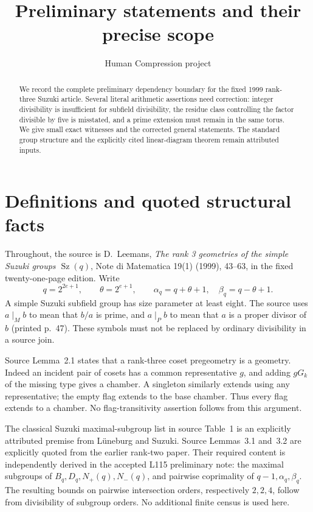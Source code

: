 \documentclass[11pt,a4paper]{article}
\title{Preliminary statements and their precise scope}
\author{Human Compression project}\date{}
\newcommand{\Sz}{\operatorname{Sz}}
\begin{document}
\maketitle
\begin{abstract}
We record the complete preliminary dependency boundary for the fixed 1999
rank-three Suzuki article. Several literal arithmetic assertions need
correction: integer divisibility is insufficient for subfield divisibility,
the residue class controlling the factor divisible by five is misstated,
and a prime extension must remain in the same torus. We give small exact
witnesses and the corrected general statements. The standard group structure
and the explicitly cited linear-diagram theorem remain attributed inputs.
\end{abstract}

\section{Definitions and quoted structural facts}
Throughout, the source is D.~Leemans, \emph{The rank 3 geometries of the
simple Suzuki groups $\Sz(q)$}, Note di Matematica 19(1) (1999), 43--63,
in the fixed twenty-one-page edition. Write
\[
 q=2^{2e+1},\qquad \theta=2^{e+1},\qquad
 \alpha_q=q+\theta+1,\quad \beta_q=q-\theta+1.
\]
A simple Suzuki subfield group has size parameter at least eight.
The source uses $a\mid_M b$ to mean that $b/a$ is prime, and
$a\mid_P b$ to mean that $a$ is a proper divisor of $b$ (printed p.~47).
These symbols must not be replaced by ordinary divisibility in a source join.

Source Lemma~2.1 states that a rank-three coset pregeometry is a geometry.
Indeed an incident pair of cosets has a common representative $g$, and
adding $gG_k$ of the missing type gives a chamber. A singleton similarly
extends using any representative; the empty flag extends to the base
chamber. Thus every flag extends to a chamber. No flag-transitivity
assertion follows from this argument.

The classical Suzuki maximal-subgroup list in source Table~1 is an
explicitly attributed premise from L\"uneburg and Suzuki. Source
Lemmas~3.1 and~3.2 are explicitly quoted from the earlier rank-two paper.
Their required content is independently derived in the accepted L115
preliminary note: the maximal subgroups of $B_q,D_q,N_+(q),N_-(q)$,
and pairwise coprimality of $q-1,\alpha_q,\beta_q$.
The resulting bounds on pairwise intersection orders, respectively
$2,2,4$, follow from divisibility of subgroup orders.
No additional finite census is used here.
\end{document}
